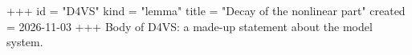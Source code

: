 +++
id = "D4VS"
kind = "lemma"
title = "Decay of the nonlinear part"
created = 2026-11-03
+++
Body of D4VS: a made-up statement about the model system.
